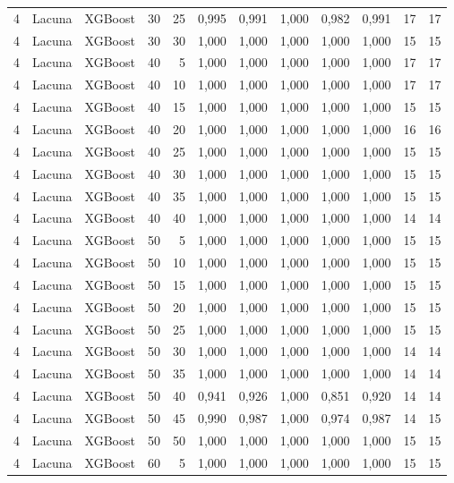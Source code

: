 \begin{longtable}{ccclrrrrrrrr}
4 & Lacuna & XGBoost & 30 & 25 & 0,995 & 0,991 & 1,000 & 0,982 & 0,991 & 17 & 17 \\
4 & Lacuna & XGBoost & 30 & 30 & 1,000 & 1,000 & 1,000 & 1,000 & 1,000 & 15 & 15 \\
4 & Lacuna & XGBoost & 40 & 5 & 1,000 & 1,000 & 1,000 & 1,000 & 1,000 & 17 & 17 \\
4 & Lacuna & XGBoost & 40 & 10 & 1,000 & 1,000 & 1,000 & 1,000 & 1,000 & 17 & 17 \\
4 & Lacuna & XGBoost & 40 & 15 & 1,000 & 1,000 & 1,000 & 1,000 & 1,000 & 15 & 15 \\
4 & Lacuna & XGBoost & 40 & 20 & 1,000 & 1,000 & 1,000 & 1,000 & 1,000 & 16 & 16 \\
4 & Lacuna & XGBoost & 40 & 25 & 1,000 & 1,000 & 1,000 & 1,000 & 1,000 & 15 & 15 \\
4 & Lacuna & XGBoost & 40 & 30 & 1,000 & 1,000 & 1,000 & 1,000 & 1,000 & 15 & 15 \\
4 & Lacuna & XGBoost & 40 & 35 & 1,000 & 1,000 & 1,000 & 1,000 & 1,000 & 15 & 15 \\
4 & Lacuna & XGBoost & 40 & 40 & 1,000 & 1,000 & 1,000 & 1,000 & 1,000 & 14 & 14 \\
4 & Lacuna & XGBoost & 50 & 5 & 1,000 & 1,000 & 1,000 & 1,000 & 1,000 & 15 & 15 \\
4 & Lacuna & XGBoost & 50 & 10 & 1,000 & 1,000 & 1,000 & 1,000 & 1,000 & 15 & 15 \\
4 & Lacuna & XGBoost & 50 & 15 & 1,000 & 1,000 & 1,000 & 1,000 & 1,000 & 15 & 15 \\
4 & Lacuna & XGBoost & 50 & 20 & 1,000 & 1,000 & 1,000 & 1,000 & 1,000 & 15 & 15 \\
4 & Lacuna & XGBoost & 50 & 25 & 1,000 & 1,000 & 1,000 & 1,000 & 1,000 & 15 & 15 \\
4 & Lacuna & XGBoost & 50 & 30 & 1,000 & 1,000 & 1,000 & 1,000 & 1,000 & 14 & 14 \\
4 & Lacuna & XGBoost & 50 & 35 & 1,000 & 1,000 & 1,000 & 1,000 & 1,000 & 14 & 14 \\
4 & Lacuna & XGBoost & 50 & 40 & 0,941 & 0,926 & 1,000 & 0,851 & 0,920 & 14 & 14 \\
4 & Lacuna & XGBoost & 50 & 45 & 0,990 & 0,987 & 1,000 & 0,974 & 0,987 & 14 & 15 \\
4 & Lacuna & XGBoost & 50 & 50 & 1,000 & 1,000 & 1,000 & 1,000 & 1,000 & 15 & 15 \\
4 & Lacuna & XGBoost & 60 & 5 & 1,000 & 1,000 & 1,000 & 1,000 & 1,000 & 15 & 15 \\

\end{longtable}
